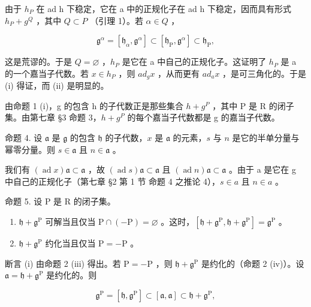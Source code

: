 由于 \(h_{P}\) 在 ad h 下稳定，它在 a 中的正规化子在 ad h 下稳定，因而具有形式 \(h_{P} + g^{Q}\) ，其中 \(Q \subset P\) （引理 1）。若 \(\alpha \in Q\) ，

\[
\mathfrak {g} ^ {\alpha} = \left[ \mathfrak {h} _ {\alpha}, \mathfrak {g} ^ {\alpha} \right] \subset \left[ \mathfrak {h} _ {\mathrm{P}}, \mathfrak {g} ^ {\alpha} \right] \subset \mathfrak {h} _ {\mathrm{P}},
\]

这是荒谬的。于是 \(Q = \varnothing\) ，\(h_{P}\) 是它在 a 中自己的正规化子。这证明了 \(h_{P}\) 是 a 的一个嘉当子代数。若 \(x \in h_{P}\) ，则 \(ad_{g}x\) ，从而更有 \(ad_{a}x\) ，是可三角化的。于是 (i) 得证，而 (ii) 是明显的。

由命题 1 (i)，g 的包含 h 的子代数正是那些集合 \(h + g^{P}\) ，其中 P 是 R 的闭子集。由第七章 §3 命题 3，\(h + g^{P}\) 的每个嘉当子代数都是 g 的嘉当子代数。

命题 4. 设 \(\mathfrak{a}\) 是 \(\mathfrak{g}\) 的包含 \(\mathfrak{h}\) 的子代数，\(x\) 是 \(\mathfrak{a}\) 的元素，\(s\) 与 \(n\) 是它的半单分量与幂零分量。则 \(s \in \mathfrak{a}\) 且 \(n \in \mathfrak{a}\) 。

我们有 \((\operatorname{ad} x)\mathfrak{a} \subset \mathfrak{a}\) ，故 \((\operatorname{ad} s)\mathfrak{a} \subset \mathfrak{a}\) 且 \((\operatorname{ad} n)\mathfrak{a} \subset \mathfrak{a}\) 。由于 a 是它在 g 中自己的正规化子（第七章 §2 第 1 节 命题 4 之推论 4），\(s \in a\) 且 \(n \in a\) 。

命题 5. 设 P 是 R 的闭子集。

\begin{enumerate}
\def\labelenumi{(\roman{enumi})}
\item
  \(\mathfrak{h} + \mathfrak{g}^{\mathrm{P}}\) 可解当且仅当 \(\mathrm{P} \cap (-\mathrm{P}) = \varnothing\) 。这时，\([\mathfrak{h} + \mathfrak{g}^{\mathrm{P}}, \mathfrak{h} + \mathfrak{g}^{\mathrm{P}}] = \mathfrak{g}^{\mathrm{P}}\) 。
\item
  \(\mathfrak{h} + \mathfrak{g}^{\mathrm{P}}\) 约化当且仅当 \(\mathrm{P} = -\mathrm{P}\) 。
\end{enumerate}

断言 (i) 由命题 2 (iii) 得出。若 \(\mathrm{P} = -\mathrm{P}\) ，则 \(\mathfrak{h} + \mathfrak{g}^{\mathrm{P}}\) 是约化的（命题 2 (iv)）。设 \(\mathfrak{a} = \mathfrak{h} + \mathfrak{g}^{\mathrm{P}}\) 是约化的。则

\[
\mathfrak {g} ^ {\mathrm{P}} = \left[ \mathfrak {h}, \mathfrak {g} ^ {\mathrm{P}} \right] \subset \left[ \mathfrak {a}, \mathfrak {a} \right] \subset \mathfrak {h} + \mathfrak {g} ^ {\mathrm{P}},
\]

